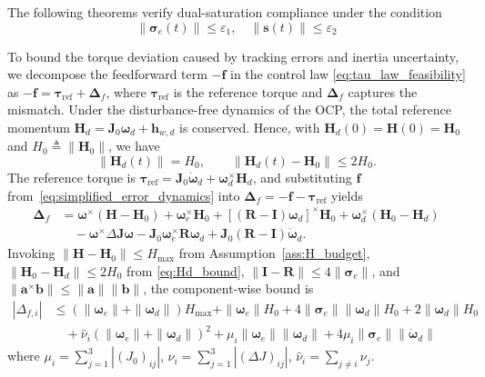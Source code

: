 \documentclass[journal]{new-aiaa}
\begin{document}
The following theorems verify dual-saturation compliance under the condition
\begin{equation}
\|\boldsymbol{\sigma}_e(t)\|\le \varepsilon_1, \quad \|\boldsymbol{s}(t)\|\le \varepsilon_2
\label{eq:error_bounds_condition}
\end{equation}

To bound the torque deviation caused by tracking errors and inertia uncertainty, we decompose the feedforward term $-\boldsymbol{f}$ in the control law \eqref{eq:tau_law_feasibility} as $-\boldsymbol{f} = \boldsymbol{\tau}_{\mathrm{ref}} + \boldsymbol{\Delta}_f$, where $\boldsymbol{\tau}_{\mathrm{ref}}$ is the reference torque and $\boldsymbol{\Delta}_f$ captures the mismatch.
Under the disturbance-free dynamics of the OCP, the total reference momentum $\boldsymbol{H}_d = \boldsymbol{J}_0\boldsymbol{\omega}_d + \boldsymbol{h}_{w,d}$ is conserved. Hence, with $\boldsymbol{H}_d(0)=\boldsymbol{H}(0)=\boldsymbol{H}_0$ and $H_0 \triangleq \|\boldsymbol{H}_0\|$, we have
\begin{equation}
\|\boldsymbol{H}_d(t)\| = H_0, \qquad \|\boldsymbol{H}_d(t)-\boldsymbol{H}_0\| \le 2H_0 .
\label{eq:Hd_bound}
\end{equation}
The reference torque is $\boldsymbol{\tau}_{\mathrm{ref}} = \boldsymbol{J}_0\dot{\boldsymbol{\omega}}_d + \boldsymbol{\omega}_d^{\times}\boldsymbol{H}_d$, and substituting $\boldsymbol{f}$ from~\eqref{eq:simplified_error_dynamics} into $\boldsymbol{\Delta}_f = -\boldsymbol{f} - \boldsymbol{\tau}_{\mathrm{ref}}$ yields
\begin{align}
\boldsymbol{\Delta}_f
&= \boldsymbol{\omega}^{\times}(\boldsymbol{H}-\boldsymbol{H}_0)
+ \boldsymbol{\omega}_e^{\times}\boldsymbol{H}_0
+ [(\boldsymbol{R}-\boldsymbol{I})\boldsymbol{\omega}_d]^{\times}\boldsymbol{H}_0
+ \boldsymbol{\omega}_d^{\times}(\boldsymbol{H}_0-\boldsymbol{H}_d) \nonumber \\
&\quad - \boldsymbol{\omega}^{\times}\Delta\boldsymbol{J}\boldsymbol{\omega}
- \boldsymbol{J}_0\boldsymbol{\omega}_e^{\times}\boldsymbol{R}\boldsymbol{\omega}_d
+ \boldsymbol{J}_0(\boldsymbol{R}-\boldsymbol{I})\dot{\boldsymbol{\omega}}_d .
\end{align}
Invoking $\|\boldsymbol{H}-\boldsymbol{H}_0\|\le H_{\max}$ from Assumption~\ref{ass:H_budget},
$\|\boldsymbol{H}_0-\boldsymbol{H}_d\|\le 2H_0$ from \eqref{eq:Hd_bound},
$\|\boldsymbol{I}-\boldsymbol{R}\|\le 4\|\boldsymbol{\sigma}_e\|$,
and $\|\boldsymbol{a}^{\times}\boldsymbol{b}\|\le\|\boldsymbol{a}\|\|\boldsymbol{b}\|$,
the component-wise bound is
\begin{align}
|\Delta_{f,i}|
&\le (\|\boldsymbol{\omega}_e\|+\|\boldsymbol{\omega}_d\|)H_{\max}
+ \|\boldsymbol{\omega}_e\|H_0
+ 4\|\boldsymbol{\sigma}_e\|\|\boldsymbol{\omega}_d\|H_0
+ 2\|\boldsymbol{\omega}_d\|H_0 \nonumber \\
&\quad + \hat\nu_i(\|\boldsymbol{\omega}_e\|+\|\boldsymbol{\omega}_d\|)^2
+ \mu_i\|\boldsymbol{\omega}_e\|\|\boldsymbol{\omega}_d\|
+ 4\mu_i\|\boldsymbol{\sigma}_e\|\|\dot{\boldsymbol{\omega}}_d\|
\label{eq:Deltaf_bound}
\end{align}
where $\mu_i=\sum_{j=1}^{3}|(J_0)_{ij}|$, $\nu_i=\sum_{j=1}^{3}|(\Delta J)_{ij}|$, $\hat\nu_i=\sum_{j\ne i}\nu_j$.
\end{document}
